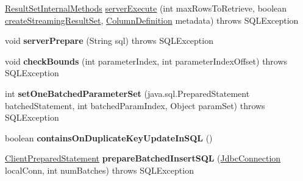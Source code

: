 \begin{DoxyCompactItemize}
\item 
\mbox{\hyperlink{interfacecom_1_1mysql_1_1cj_1_1jdbc_1_1result_1_1_result_set_internal_methods}{Result\+Set\+Internal\+Methods}} \mbox{\hyperlink{classcom_1_1mysql_1_1cj_1_1jdbc_1_1_server_prepared_statement_a47b5b3c9203f0b52a897ca2fa6537ff2}{server\+Execute}} (int max\+Rows\+To\+Retrieve, boolean \mbox{\hyperlink{classcom_1_1mysql_1_1cj_1_1jdbc_1_1_statement_impl_a4a514bb3e111c30e6b376b74bb8f78e8}{create\+Streaming\+Result\+Set}}, \mbox{\hyperlink{interfacecom_1_1mysql_1_1cj_1_1protocol_1_1_column_definition}{Column\+Definition}} metadata)  throws S\+Q\+L\+Exception 
\item 
\mbox{\label{classcom_1_1mysql_1_1cj_1_1jdbc_1_1_server_prepared_statement_aac9d9eb5e0c2d0aee524205be1c80ec8}} 
void {\bfseries server\+Prepare} (String sql)  throws S\+Q\+L\+Exception 
\item 
\mbox{\label{classcom_1_1mysql_1_1cj_1_1jdbc_1_1_server_prepared_statement_ae05f9bb12438e3edb3b0d9b726f3799c}} 
void {\bfseries check\+Bounds} (int parameter\+Index, int parameter\+Index\+Offset)  throws S\+Q\+L\+Exception 
\item 
\mbox{\label{classcom_1_1mysql_1_1cj_1_1jdbc_1_1_server_prepared_statement_a91ef33751560d9b6961a1526710b7d76}} 
int {\bfseries set\+One\+Batched\+Parameter\+Set} (java.\+sql.\+Prepared\+Statement batched\+Statement, int batched\+Param\+Index, Object param\+Set)  throws S\+Q\+L\+Exception 
\item 
\mbox{\label{classcom_1_1mysql_1_1cj_1_1jdbc_1_1_server_prepared_statement_aee0399fcf1e0c3fd1dd8b05dbff5bec9}} 
boolean {\bfseries contains\+On\+Duplicate\+Key\+Update\+In\+S\+QL} ()
\item 
\mbox{\label{classcom_1_1mysql_1_1cj_1_1jdbc_1_1_server_prepared_statement_a7bd2ee73987a42a93a0cba6b04fd3923}} 
\mbox{\hyperlink{classcom_1_1mysql_1_1cj_1_1jdbc_1_1_client_prepared_statement}{Client\+Prepared\+Statement}} {\bfseries prepare\+Batched\+Insert\+S\+QL} (\mbox{\hyperlink{interfacecom_1_1mysql_1_1cj_1_1jdbc_1_1_jdbc_connection}{Jdbc\+Connection}} local\+Conn, int num\+Batches)  throws S\+Q\+L\+Exception 
\end{DoxyCompactItemize}
